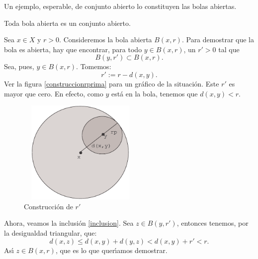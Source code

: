 Un ejemplo, esperable, de conjunto abierto lo constituyen las
bolas abiertas.
\begin{proposicion} Toda bola abierta es un conjunto abierto.
\end{proposicion}
\begin{demo} Sea $x\in X$ y $r>0$. Consideremos la bola abierta
$B(x,r)$. Para demostrar que la bola es abierta, hay que
encontrar, para todo $y\in B(x,r)$, un $r'>0$ tal que
\begin{equation}\label{inclusion}
	B(y,r')\subset B(x,r).
\end{equation}
Sea, pues, $y\in B(x,r)$. Tomemos:
\[r':=r-d(x,y).\]
Ver la figura \vref{construccionrprima} para un gr\'afico de la
situaci\'on. Este $r'$ es mayor que cero. En efecto, como $y$
est\'a en la bola, tenemos que $d(x,y)<r$.
\begin{figure}
\begin{center}
	\includegraphics[height=5cm, width=6cm]{grafbol.eps}
	\caption{Construcci\'on de $r'$}\label{construccionrprima}
\end{center}
\end{figure}



Ahora, veamos la inclusi\'on \vref{inclusion}. Sea $z\in B(y,r')$,
entonces tenemos, por la desigualdad triangular, que:
\[d(x,z)\leq d(x,y)+d(y,z)< d(x,y)+r'<r.\]
As\'{\i} $z\in B(x,r)$, que es lo que quer\'{\i}amos demostrar.
\end{demo}


